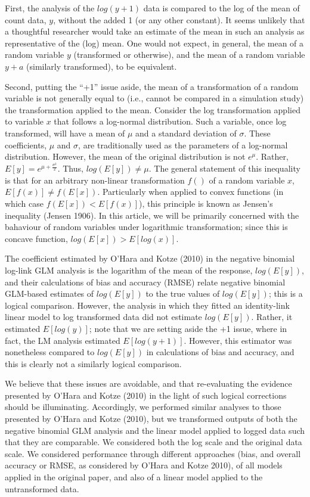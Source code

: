 \documentclass[]{article}
\begin{document}
First, the analysis of the \(log(y+1)\) data is compared to the log of
the mean of count data, \(y\), without the added 1 (or any other
constant). It seems unlikely that a thoughtful researcher would take an
estimate of the mean in such an analysis as representative of the (log)
mean. One would not expect, in general, the mean of a random variable
\(y\) (transformed or otherwise), and the mean of a random variable
\(y+a\) (similarly transformed), to be equivalent.

Second, putting the ``+1'' issue aside, the mean of a transformation of
a random variable is not generally equal to (i.e., cannot be compared in
a simulation study) the transformation applied to the mean. Consider the
log transformation applied to variable \(x\) that follows a log-normal
distribution. Such a variable, once log transformed, will have a mean of
\(\mu\) and a standard deviation of \(\sigma\). These coefficients,
\(\mu\) and \(\sigma\), are traditionally used as the parameters of a
log-normal distribution. However, the mean of the original distribution
is not \(e^\mu\). Rather, \(E[y] = e^{\mu+\frac{\sigma^2}{2}}\). Thus,
\(log(E[y]) \neq \mu\). The general statement of this inequality is that
for an arbitrary non-linear transformation \(f()\) of a random variable
\(x\), \(E[f(x)] \neq f(E[x]).\) Particularly when applied to convex
functions (in which case \(f(E[x]) < E[f(x)]\)), this principle is known
as Jensen's inequality (Jensen 1906). In this article, we will be
primarily concerned with the bahaviour of random variables under
logarithmic transformation; since this is concave function,
\(log(E[x]) > E[log(x)]\).

The coefficient estimated by O'Hara and Kotze (2010) in the negative
binomial log-link GLM analysis is the logarithm of the mean of the
response, \(log(E[y])\), and their calculations of bias and accuracy
(RMSE) relate negative binomial GLM-based estimates of \(log(E[y])\) to
the true values of \(log(E[y])\); this is a logical comparison. However,
the analysis in which they fitted an identity-link linear model to log
transformed data did not estimate \(log(E[y])\). Rather, it estimated
\(E[log(y)]\); note that we are setting aside the +1 issue, where in
fact, the LM analysis estimated \(E[log(y+1)]\). However, this estimator
was nonetheless compared to \(log(E[y])\) in calculations of bias and
accuracy, and this is clearly not a similarly logical comparison.

We believe that these issues are avoidable, and that re-evaluating the
evidence presented by O'Hara and Kotze (2010) in the light of such
logical corrections should be illuminating. Accordingly, we performed
similar analyses to those presented by O'Hara and Kotze (2010), but we
transformed outputs of both the negative binomial GLM analysis and the
linear model applied to logged data such that they are comparable. We
considered both the log scale and the original data scale. We considered
performance through different approaches (bias, and overall accuracy or
RMSE, as considered by O'Hara and Kotze 2010), of all models applied in
the original paper, and also of a linear model applied to the
untransformed data.
\end{document}
